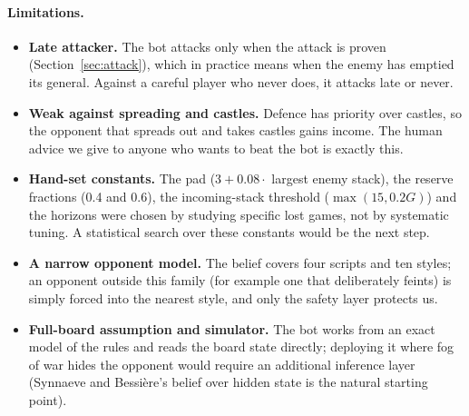\paragraph{Limitations.}
\begin{itemize}
\item \textbf{Late attacker.} The bot attacks only when the attack is proven (Section~\ref{sec:attack}), which in
practice means when the enemy has emptied its general. Against a careful player who never does, it attacks late or
never.
\item \textbf{Weak against spreading and castles.} Defence has priority over castles, so the opponent that spreads
out and takes castles gains income. The human advice we give to anyone who wants to beat the bot is exactly this.
\item \textbf{Hand-set constants.} The pad ($3+0.08\cdot$ largest enemy stack), the reserve fractions (0.4 and
0.6), the incoming-stack threshold ($\max(15,0.2G)$) and the horizons were chosen by studying specific lost games,
not by systematic tuning. A statistical search over these constants would be the next step.
\item \textbf{A narrow opponent model.} The belief covers four scripts and ten styles; an opponent outside this
family (for example one that deliberately feints) is simply forced into the nearest style, and only the safety
layer protects us.
\item \textbf{Full-board assumption and simulator.} The bot works from an exact model of the rules and reads the
board state directly; deploying it where fog of war hides the opponent would require an additional inference layer
(Synnaeve and Bessi\`ere's belief over hidden state is the natural starting point).
\end{itemize}

